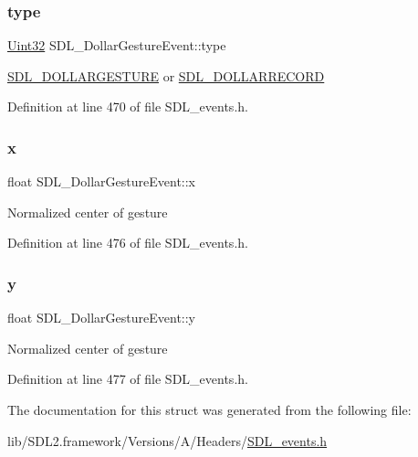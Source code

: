 \subsubsection{\texorpdfstring{type}{type}}
{\footnotesize\ttfamily \mbox{\hyperlink{_s_d_l__stdinc_8h_add440eff171ea5f55cb00c4a9ab8672d}{Uint32}} S\+D\+L\+\_\+\+Dollar\+Gesture\+Event\+::type}

\mbox{\hyperlink{_s_d_l__events_8h_a3b589e89be6b35c02e0dd34a55f3fccaaac5b40f77c7e1eba688d536d465989c6}{S\+D\+L\+\_\+\+D\+O\+L\+L\+A\+R\+G\+E\+S\+T\+U\+RE}} or \mbox{\hyperlink{_s_d_l__events_8h_a3b589e89be6b35c02e0dd34a55f3fccaa9ce9b2a0e8fd0e130d8ac8499704a277}{S\+D\+L\+\_\+\+D\+O\+L\+L\+A\+R\+R\+E\+C\+O\+RD}} 

Definition at line 470 of file S\+D\+L\+\_\+events.\+h.

\mbox{\label{struct_s_d_l___dollar_gesture_event_a9888449bd8842ed96494b4db16a6097b}} 
\subsubsection{\texorpdfstring{x}{x}}
{\footnotesize\ttfamily float S\+D\+L\+\_\+\+Dollar\+Gesture\+Event\+::x}

Normalized center of gesture 

Definition at line 476 of file S\+D\+L\+\_\+events.\+h.

\mbox{\label{struct_s_d_l___dollar_gesture_event_a293b2303acc1cfc63c167c5525e6eab5}} 
\subsubsection{\texorpdfstring{y}{y}}
{\footnotesize\ttfamily float S\+D\+L\+\_\+\+Dollar\+Gesture\+Event\+::y}

Normalized center of gesture 

Definition at line 477 of file S\+D\+L\+\_\+events.\+h.



The documentation for this struct was generated from the following file\+:\begin{DoxyCompactItemize}
\item 
lib/\+S\+D\+L2.\+framework/\+Versions/\+A/\+Headers/\mbox{\hyperlink{_s_d_l__events_8h}{S\+D\+L\+\_\+events.\+h}}\end{DoxyCompactItemize}
